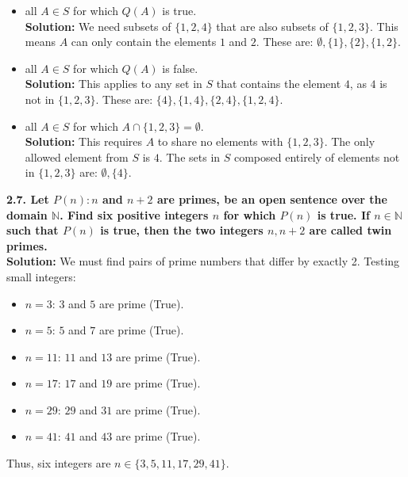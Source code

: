 \documentclass[11pt]{article}
\begin{document}
\begin{itemize}
    \item[(a)] all $A \in S$ for which $Q(A)$ is true. \\
    \textbf{Solution:} We need subsets of $\{1, 2, 4\}$ that are also subsets of $\{1, 2, 3\}$. This means $A$ can only contain the elements $1$ and $2$. These are: \textbf{$\emptyset, \{1\}, \{2\}, \{1, 2\}$}.
    
    \item[(b)] all $A \in S$ for which $Q(A)$ is false. \\
    \textbf{Solution:} This applies to any set in $S$ that contains the element $4$, as $4$ is not in $\{1, 2, 3\}$. These are: \textbf{$\{4\}, \{1, 4\}, \{2, 4\}, \{1, 2, 4\}$}.
    
    \item[(c)] all $A \in S$ for which $A \cap \{1, 2, 3\} = \emptyset$. \\
    \textbf{Solution:} This requires $A$ to share no elements with $\{1, 2, 3\}$. The only allowed element from $S$ is $4$. The sets in $S$ composed entirely of elements not in $\{1, 2, 3\}$ are: \textbf{$\emptyset, \{4\}$}.
\end{itemize}

\vspace{0.5cm}
\textbf{2.7. Let $P(n) : n$ and $n+2$ are primes, be an open sentence over the domain $\mathbb{N}$. Find six positive integers $n$ for which $P(n)$ is true. If $n \in \mathbb{N}$ such that $P(n)$ is true, then the two integers $n, n+2$ are called twin primes.} \\
\textbf{Solution:} We must find pairs of prime numbers that differ by exactly 2. Testing small integers:
\begin{itemize}
    \item $n=3$: $3$ and $5$ are prime (True).
    \item $n=5$: $5$ and $7$ are prime (True).
    \item $n=11$: $11$ and $13$ are prime (True).
    \item $n=17$: $17$ and $19$ are prime (True).
    \item $n=29$: $29$ and $31$ are prime (True).
    \item $n=41$: $41$ and $43$ are prime (True).
\end{itemize}
Thus, six integers are \textbf{$n \in \{3, 5, 11, 17, 29, 41\}$}.
\end{document}
